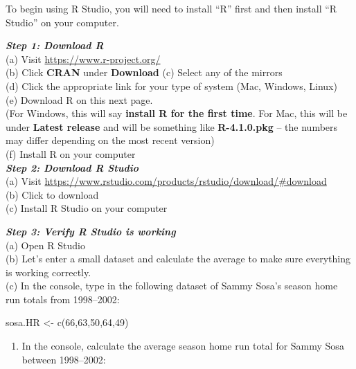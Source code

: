 \documentclass[
  11pt,
]{book}
\newenvironment{Shaded}{\begin{snugshade}}{\end{snugshade}}
\newcommand{\DecValTok}[1]{\textcolor[rgb]{0.00,0.00,0.81}{#1}}
\newcommand{\FunctionTok}[1]{\textcolor[rgb]{0.00,0.00,0.00}{#1}}
\newcommand{\NormalTok}[1]{#1}
\newcommand{\OtherTok}[1]{\textcolor[rgb]{0.56,0.35,0.01}{#1}}
\providecommand{\tightlist}{%
  \setlength{\itemsep}{0pt}\setlength{\parskip}{0pt}}
\theoremstyle{definition}
\theoremstyle{definition}
\theoremstyle{definition}
\theoremstyle{definition}
\theoremstyle{remark}
\begin{document}
To begin using R Studio, you will need to install ``R'' first and then install ``R Studio'' on your computer.

\textbf{\emph{Step 1: Download R}}\\
(a) Visit \url{https://www.r-project.org/}\\
(b) Click \textbf{CRAN} under \textbf{Download}
(c) Select any of the mirrors\\
(d) Click the appropriate link for your type of system (Mac, Windows, Linux)\\
(e) Download R on this next page.\\
(For Windows, this will say \textbf{install R for the first time}. For Mac, this will be under \textbf{Latest release} and will be something like \textbf{R-4.1.0.pkg} -- the numbers may differ depending on the most recent version)\\
(f) Install R on your computer\\

\textbf{\emph{Step 2: Download R Studio}}\\
(a) Visit \url{https://www.rstudio.com/products/rstudio/download/\#download}\\
(b) Click to download\\
(c) Install R Studio on your computer\\

\newpage

\textbf{\emph{Step 3: Verify R Studio is working}}\\
(a) Open R Studio\\
(b) Let's enter a small dataset and calculate the average to make sure everything is working correctly.\\
(c) In the console, type in the following dataset of Sammy Sosa's season home run totals from 1998--2002:\\

\begin{Shaded}
\begin{Highlighting}[]
\NormalTok{sosa.HR }\OtherTok{\textless{}{-}} \FunctionTok{c}\NormalTok{(}\DecValTok{66}\NormalTok{,}\DecValTok{63}\NormalTok{,}\DecValTok{50}\NormalTok{,}\DecValTok{64}\NormalTok{,}\DecValTok{49}\NormalTok{)}
\end{Highlighting}
\end{Shaded}

\begin{enumerate}
\def\labelenumi{(\alph{enumi})}
\setcounter{enumi}{3}
\tightlist
\item
  In the console, calculate the average season home run total for Sammy Sosa between 1998--2002:\\
\end{enumerate}
\end{document}
